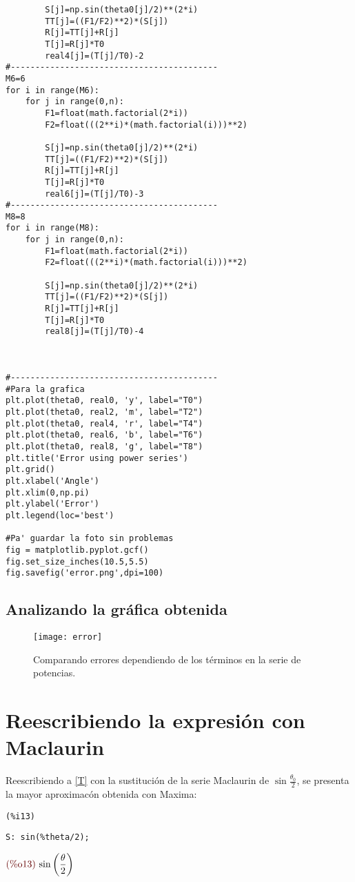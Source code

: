 \documentclass[12pt]{article}
\begin{document}
{\begin{verbatim}
        S[j]=np.sin(theta0[j]/2)**(2*i)
        TT[j]=((F1/F2)**2)*(S[j])
        R[j]=TT[j]+R[j]
        T[j]=R[j]*T0
        real4[j]=(T[j]/T0)-2
#------------------------------------------
M6=6
for i in range(M6):
    for j in range(0,n):
        F1=float(math.factorial(2*i))
        F2=float(((2**i)*(math.factorial(i)))**2)
        
        S[j]=np.sin(theta0[j]/2)**(2*i)
        TT[j]=((F1/F2)**2)*(S[j])
        R[j]=TT[j]+R[j]
        T[j]=R[j]*T0
        real6[j]=(T[j]/T0)-3
#------------------------------------------
M8=8
for i in range(M8):
    for j in range(0,n):
        F1=float(math.factorial(2*i))
        F2=float(((2**i)*(math.factorial(i)))**2)
        
        S[j]=np.sin(theta0[j]/2)**(2*i)
        TT[j]=((F1/F2)**2)*(S[j])
        R[j]=TT[j]+R[j]
        T[j]=R[j]*T0
        real8[j]=(T[j]/T0)-4



#------------------------------------------
#Para la grafica
plt.plot(theta0, real0, 'y', label="T0")
plt.plot(theta0, real2, 'm', label="T2")
plt.plot(theta0, real4, 'r', label="T4")
plt.plot(theta0, real6, 'b', label="T6")
plt.plot(theta0, real8, 'g', label="T8")
plt.title('Error using power series')
plt.grid()
plt.xlabel('Angle')
plt.xlim(0,np.pi)
plt.ylabel('Error')
plt.legend(loc='best')

#Pa' guardar la foto sin problemas
fig = matplotlib.pyplot.gcf()
fig.set_size_inches(10.5,5.5)
fig.savefig('error.png',dpi=100)
\end{verbatim}}

\subsection*{Analizando la gráfica obtenida}
\begin{figure}[H]
\centering
\texttt{[image: error]}
\caption{Comparando errores dependiendo de los términos en la serie de potencias.}
\end{figure}

\section{Reescribiendo la expresión con Maclaurin}
Reescribiendo a \eqref{T} con la sustitución de la serie Maclaurin de $\displaystyle \sin{\frac{\theta_0}{2}}$, se presenta la mayor aproximacón obtenida con Maxima:\\
\noindent
\begin{minipage}[t]{8ex}{\color{red}\bf
\begin{verbatim}
(%i13) 
\end{verbatim}}
\end{minipage}
\begin{minipage}[t]{\textwidth}{\color{blue}
\begin{verbatim}
S: sin(%theta/2);
\end{verbatim}}
\end{minipage}
\begin{math}\displaystyle
\parbox{8ex}{\color{labelcolor}(\%o13) }
\mathrm{sin}\left( \frac{\theta}{2}\right) 
\end{math}
\end{document}
